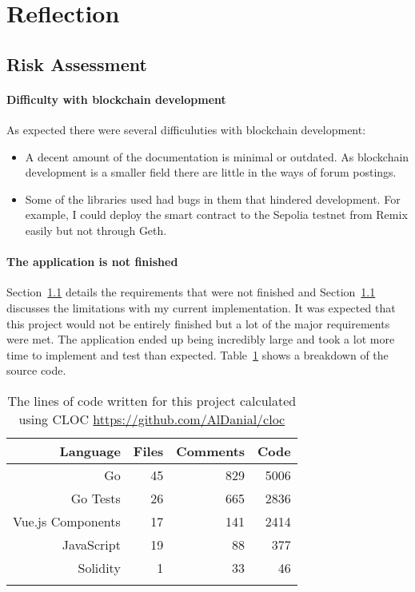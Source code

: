 \section{Reflection}

\subsection{Risk Assessment}

\paragraph*{Difficulty with blockchain development}
As expected there were several difficuluties with blockchain development:

\begin{itemize}
  \item A decent amount of the documentation is minimal or outdated. As blockchain development is a smaller field there are little in the ways of forum postings.
  \item Some of the libraries used had bugs in them that hindered development. For example, I could deploy the smart contract to the Sepolia testnet from Remix easily but not through Geth. 
\end{itemize}

\paragraph*{The application is not finished}
Section~\ref{} details the requirements that were not finished and Section~\ref{} discusses the limitations with my current implementation. It was expected that this project would not be entirely finished but a lot of the major requirements were met.
\x
The application ended up being incredibly large and took a lot more time to implement and test than expected. Table~\ref{tab:cloc} shows a breakdown of the source code.

\begin{longtable}{ | r | r | r | r | }
  \hline
  \textbf{Language} & \textbf{Files} & \textbf{Comments} & \textbf{Code}
  \\\hline
  Go
  & 45
  & 829
  & 5006
  \\\hline
  Go Tests
  & 26
  & 665
  & 2836
  \\\hline
  Vue.js Components
  & 17
  & 141
  & 2414
  \\\hline
  JavaScript
  & 19
  & 88
  & 377
  \\\hline
  Solidity
  & 1
  & 33
  & 46
  \\\hline
  \caption{The lines of code written for this project calculated using CLOC \url{https://github.com/AlDanial/cloc}}
  \label{tab:cloc}
\end{longtable}

